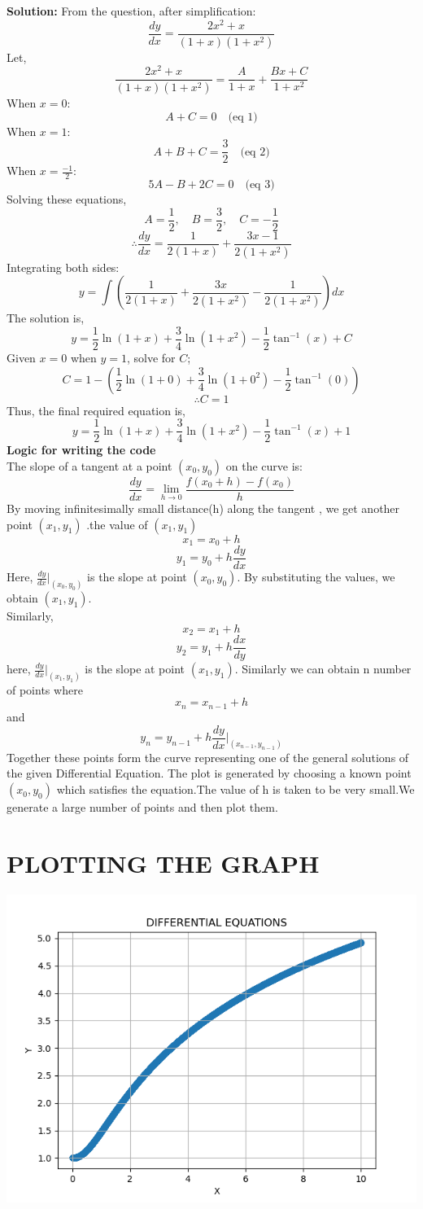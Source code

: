 \documentclass[journal]{IEEEtran}
\begin{document}
\textbf{Solution:}
From the question, after simplification:
$$
\frac{dy}{dx}= \frac{2x^2 + x}{(1+x)(1+x^2)}
$$
Let,
$$
\frac{2x^2 + x}{(1+x)(1+x^2)} = \frac{A}{1+x} + \frac{Bx+C}{1+x^2}
$$
When $x = 0$:
$$
A + C = 0 \quad \text{(eq 1)}
$$
When $x = 1$:
$$
A + B + C = \frac{3}{2} \quad \text{(eq 2)}
$$
When $x = \frac{-1}{2}$:
$$
5A -B + 2C = 0 \quad \text{(eq 3)}
$$
Solving these equations,
$$
A = \frac{1}{2}, \quad B = \frac{3}{2}, \quad C = -\frac{1}{2}
$$
$$
\therefore \frac{dy}{dx} = \frac{1}{2(1+x)} + \frac{3x-1}{2(1+x^2)}
$$
Integrating both sides:
$$
y = \int \left(\frac{1}{2(1+x)} + \frac{3x}{2(1+x^2)} - \frac{1}{2(1+x^2)}\right) dx
$$
The solution is,
$$
y = \frac{1}{2} \ln(1+x) + \frac{3}{4} \ln(1+x^2) - \frac{1}{2} \tan^{-1}(x) + C
$$
Given $x = 0$ when $y = 1$, solve for $C$;
$$
C = 1 - \left(\frac{1}{2} \ln(1+0) + \frac{3}{4} \ln(1+0^2) - \frac{1}{2} \tan^{-1}(0)\right)
$$
$$
\therefore C = 1
$$
Thus, the final required equation is,
$$
y = \frac{1}{2} \ln(1+x) + \frac{3}{4} \ln(1+x^2) - \frac{1}{2} \tan^{-1}(x) + 1
$$
\textbf{Logic for writing the code}
\\
The slope of a tangent at a point $(x_0, y_0)$ on the curve is: 
\[
\frac{dy}{dx} = \lim_{h \to 0} \frac{f(x_0 + h) - f(x_0)}{h}
\]
By moving infinitesimally small distance(h) along the tangent , we get another point $(x_1, y_1)$ .the value of $(x_1,y_1)$
$$
x_1=x_0+h
$$
$$
y_1=y_0+h{\frac{dy}{dx}}
$$
Here, $\frac{dy}{dx} \bigg|_{(x_0, y_0)}$ is the slope at point $(x_0, y_0)$. 
By substituting the values, we obtain $(x_1, y_1)$. 
\\
Similarly, 
\[
x_2= x_1 + h
\]
\[
y_2=y_1+h{\frac{dx}{dy}}
\]
here,
$\frac{dy}{dx} \bigg|_{(x_1, y_1)}$ is the slope at point $(x_1, y_1)$.
Similarly we can obtain n number of points where $$x_n=x_{n-1}+h$$ and $$y_n=y_{n-1}+h{\frac{dy}{dx} \bigg|_{(x_{n-1},y_{n-1})}}$$
 Together these points form the curve representing one of the general solutions of the given Differential Equation. The plot is generated by choosing a known point $(x_0, y_0)$ which satisfies the equation.The value of h is taken to be very small.We generate a large number of points and then plot them.

\section*{PLOTTING THE GRAPH}
\begin{center}
    \includegraphics[scale=0.5]{fig/fig.png}
\end{center}
\end{document}
